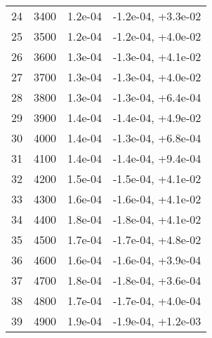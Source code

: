 \begin{table}
\begin{adjustbox}{width=1\textwidth/2}
\begin{tabular}{|c|c|c|c|}
\cline{1-4}
24 & 3400 & 1.2e-04 & -1.2e-04, +3.3e-02 \\
\cline{1-4}
25 & 3500 & 1.2e-04 & -1.2e-04, +4.0e-02 \\
\cline{1-4}
26 & 3600 & 1.3e-04 & -1.3e-04, +4.1e-02 \\
\cline{1-4}
27 & 3700 & 1.3e-04 & -1.3e-04, +4.0e-02 \\
\cline{1-4}
28 & 3800 & 1.3e-04 & -1.3e-04, +6.4e-04 \\
\cline{1-4}
29 & 3900 & 1.4e-04 & -1.4e-04, +4.9e-02 \\
\cline{1-4}
30 & 4000 & 1.4e-04 & -1.3e-04, +6.8e-04 \\
\cline{1-4}
31 & 4100 & 1.4e-04 & -1.4e-04, +9.4e-04 \\
\cline{1-4}
32 & 4200 & 1.5e-04 & -1.5e-04, +4.1e-02 \\
\cline{1-4}
33 & 4300 & 1.6e-04 & -1.6e-04, +4.1e-02 \\
\cline{1-4}
34 & 4400 & 1.8e-04 & -1.8e-04, +4.1e-02 \\
\cline{1-4}
35 & 4500 & 1.7e-04 & -1.7e-04, +4.8e-02 \\
\cline{1-4}
36 & 4600 & 1.6e-04 & -1.6e-04, +3.9e-04 \\
\cline{1-4}
37 & 4700 & 1.8e-04 & -1.8e-04, +3.6e-04 \\
\cline{1-4}
38 & 4800 & 1.7e-04 & -1.7e-04, +4.0e-04 \\
\cline{1-4}
39 & 4900 & 1.9e-04 & -1.9e-04, +1.2e-03 \\
\cline{1-4}
\end{tabular}
\end{adjustbox}
\end{table}

